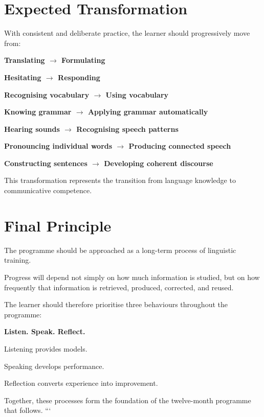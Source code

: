 \section*{Expected Transformation}

With consistent and deliberate practice, the learner should progressively move from:

\begin{center}
\textbf{Translating $\rightarrow$ Formulating}
\end{center}

\begin{center}
\textbf{Hesitating $\rightarrow$ Responding}
\end{center}

\begin{center}
\textbf{Recognising vocabulary $\rightarrow$ Using vocabulary}
\end{center}

\begin{center}
\textbf{Knowing grammar $\rightarrow$ Applying grammar automatically}
\end{center}

\begin{center}
\textbf{Hearing sounds $\rightarrow$ Recognising speech patterns}
\end{center}

\begin{center}
\textbf{Pronouncing individual words $\rightarrow$ Producing connected speech}
\end{center}

\begin{center}
\textbf{Constructing sentences $\rightarrow$ Developing coherent discourse}
\end{center}

This transformation represents the transition from language knowledge to communicative competence.

\section*{Final Principle}

The programme should be approached as a long-term process of linguistic training.

Progress will depend not simply on how much information is studied, but on how frequently that information is retrieved, produced, corrected, and reused.

The learner should therefore prioritise three behaviours throughout the programme:

\begin{center}
\Large
\textbf{Listen. Speak. Reflect.}
\normalsize
\end{center}

Listening provides models.

Speaking develops performance.

Reflection converts experience into improvement.

Together, these processes form the foundation of the twelve-month programme that follows.
```